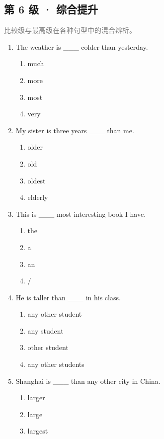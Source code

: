 \documentclass[11pt,a4paper]{ctexart}
\begin{document}
\subsection*{第 6 级 · 综合提升}
\noindent\textcolor{gray}{比较级与最高级在各种句型中的混合辨析。}\par\smallskip
\begin{enumerate}[leftmargin=*,itemsep=4pt]
\item The weather is \_\_\_ colder than yesterday.
\begin{enumerate}[label=\Alph*.,leftmargin=2em,itemsep=1pt,topsep=2pt]
\item much
\item more
\item most
\item very
\end{enumerate}
\item My sister is three years \_\_\_ than me.
\begin{enumerate}[label=\Alph*.,leftmargin=2em,itemsep=1pt,topsep=2pt]
\item older
\item old
\item oldest
\item elderly
\end{enumerate}
\item This is \_\_\_ most interesting book I have.
\begin{enumerate}[label=\Alph*.,leftmargin=2em,itemsep=1pt,topsep=2pt]
\item the
\item a
\item an
\item /
\end{enumerate}
\item He is taller than \_\_\_ in his class.
\begin{enumerate}[label=\Alph*.,leftmargin=2em,itemsep=1pt,topsep=2pt]
\item any other student
\item any student
\item other student
\item any other students
\end{enumerate}
\item Shanghai is \_\_\_ than any other city in China.
\begin{enumerate}[label=\Alph*.,leftmargin=2em,itemsep=1pt,topsep=2pt]
\item larger
\item large
\item largest

\end{enumerate}
\end{enumerate}
\end{document}
